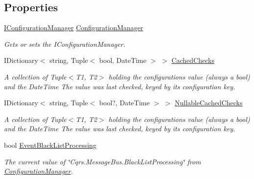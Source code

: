 \subsection*{Properties}
\begin{DoxyCompactItemize}
\item 
\hyperlink{interfaceCqrs_1_1Configuration_1_1IConfigurationManager}{I\+Configuration\+Manager} \hyperlink{classCqrs_1_1Bus_1_1BusHelper_aff0eaa0679d808e268ab4b5fb669bac8_aff0eaa0679d808e268ab4b5fb669bac8}{Configuration\+Manager}
\begin{DoxyCompactList}\small\item\em Gets or sets the I\+Configuration\+Manager. \end{DoxyCompactList}\item 
I\+Dictionary$<$ string, Tuple$<$ bool, Date\+Time $>$ $>$ \hyperlink{classCqrs_1_1Bus_1_1BusHelper_ae29e80bd315b6284509c9fd0b977d2a0_ae29e80bd315b6284509c9fd0b977d2a0}{Cached\+Checks}
\begin{DoxyCompactList}\small\item\em A collection of Tuple$<$\+T1, T2$>$ holding the configurations value (always a bool) and the Date\+Time The value was last checked, keyed by it\textquotesingle{}s configuration key. \end{DoxyCompactList}\item 
I\+Dictionary$<$ string, Tuple$<$ bool?, Date\+Time $>$ $>$ \hyperlink{classCqrs_1_1Bus_1_1BusHelper_aa5808a8927948e071c9aef24c89feb70_aa5808a8927948e071c9aef24c89feb70}{Nullable\+Cached\+Checks}
\begin{DoxyCompactList}\small\item\em A collection of Tuple$<$\+T1, T2$>$ holding the configurations value (always a bool) and the Date\+Time The value was last checked, keyed by it\textquotesingle{}s configuration key. \end{DoxyCompactList}\item 
bool \hyperlink{classCqrs_1_1Bus_1_1BusHelper_ae8d3525369ee9572de06f935cc09510b_ae8d3525369ee9572de06f935cc09510b}{Event\+Black\+List\+Processing}
\begin{DoxyCompactList}\small\item\em The current value of \char`\"{}\+Cqrs.\+Message\+Bus.\+Black\+List\+Processing\char`\"{} from \hyperlink{classCqrs_1_1Bus_1_1BusHelper_aff0eaa0679d808e268ab4b5fb669bac8_aff0eaa0679d808e268ab4b5fb669bac8}{Configuration\+Manager}. \end{DoxyCompactList}\item 

\end{DoxyCompactItemize}
